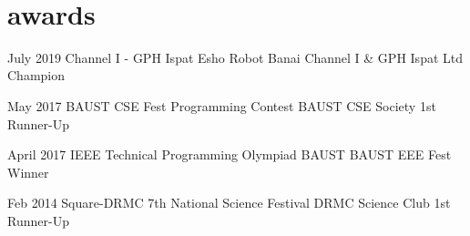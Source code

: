 \
\section{awards}
\begin{entrylist}
	\entry
	{July 2019}
	{Channel I - GPH Ispat Esho Robot Banai}
	{Channel I \& GPH Ispat Ltd}
	{Champion}

	\entry
	{May 2017}
	{BAUST CSE Fest Programming Contest}
	{BAUST CSE Society}
	{1st Runner-Up}

	\entry
	{April 2017}
	{IEEE Technical Programming Olympiad BAUST}
	{BAUST EEE Fest}
	{Winner}

	\entry
	{Feb 2014}
	{Square-DRMC 7th National Science Festival}
	{DRMC Science Club}
	{1st Runner-Up}
\end{entrylist}